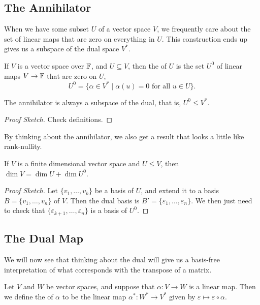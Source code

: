 \documentclass[a4paper]{scrartcl}
\begin{document}
\subsection{The Annihilator}


When we have some subset $U$ of a vector space $V$, we frequently care about the set of linear maps that are zero on everything in $U$. This construction ends up gives us a subspace of the dual space $V^*$.


\begin{definition}[Annihilator]
    If $V$ is a vector space over $\mathbb{F}$, and $U \subseteq V$, then the  of $U$ is the set $U^0$ of linear maps $V \rightarrow \mathbb{F}$ that are zero on $U$,
    $$
    U^0 = \{ \alpha \in V^* \mid \alpha(u) = 0 \text{ for all }u \in U\}.
    $$
\end{definition}

\begin{lemma}
    The annihilator is always a subspace of the dual, that is, $U^0 \leq V^*$.
\end{lemma}
\begin{proof}[Proof Sketch]    
    Check definitions.
\end{proof}

By thinking about the annihilator, we also get a result that looks a little like rank-nullity.

\begin{lemma}
    If $V$ is a finite dimensional vector space and $U \leq V$, then $\dim V = \dim U + \dim U^0$.
\end{lemma}
\begin{proof}[Proof Sketch]
    Let $\{v_1, \dots, v_k\}$ be a basis of $U$, and extend it to a basis $B = \{v_1, \dots, v_n\}$ of $V$. Then the dual basis is $B' = \{\varepsilon_1, \dots, \varepsilon_n\}$.
    We then just need to check that $\{\varepsilon_{k + 1}, \dots, \varepsilon_n\}$ is a basis of $U^0$.
\end{proof}

\subsection{The Dual Map}

We will now see that thinking about the dual will give us a basis-free interpretation of what corresponds with the transpose of a matrix.

\begin{definition}
    Let $V$ and $W$ be vector spaces, and suppose that $\alpha: V \rightarrow W$ is a linear map. Then we define the  of $\alpha$ to be the linear map $\alpha^*: W^* \rightarrow V^*$ given by $\varepsilon \mapsto \varepsilon \circ \alpha$.
\end{definition}
\end{document}
